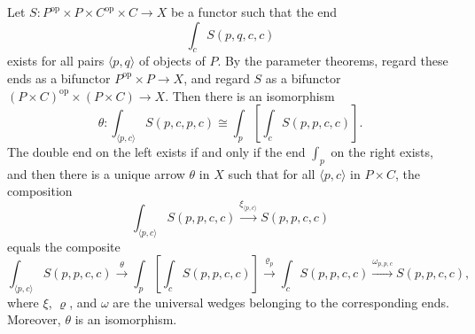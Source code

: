 Let $S: P^{\mathrm{op}} \times P \times C^{\mathrm{op}} \times C \to X$ be a functor such that the end
$$\int_c S(p, q, c, c)$$
exists for all pairs $\langle p, q \rangle$ of objects of $P$. By the parameter theorems, regard these ends as a bifunctor $P^{\mathrm{op}} \times P \to X$, and regard $S$ as a bifunctor $(P \times C)^{\mathrm{op}} \times (P \times C) \to X$. Then there is an isomorphism
$$\theta: \int_{\langle p, c \rangle} S(p, c, p, c) \cong \int_p \left[ \int_c S(p, p, c, c) \right].$$
The double end on the left exists if and only if the end $\int_p$ on the right exists, and then there is a unique arrow $\theta$ in $X$ such that for all $\langle p, c \rangle$ in $P \times C$, the composition
$$\int_{\langle p, c \rangle} S(p, p, c, c) \xrightarrow{\xi_{\langle p, c \rangle}} S(p, p, c, c)$$
equals the composite
$$\int_{\langle p, c \rangle} S(p, p, c, c) \xrightarrow{\theta} \int_p \left[ \int_c S(p, p, c, c) \right] \xrightarrow{\varrho_p} \int_c S(p, p, c, c) \xrightarrow{\omega_{p, p, c}} S(p, p, c, c),$$
where $\xi$, $\varrho$, and $\omega$ are the universal wedges belonging to the corresponding ends. Moreover, $\theta$ is an isomorphism.
